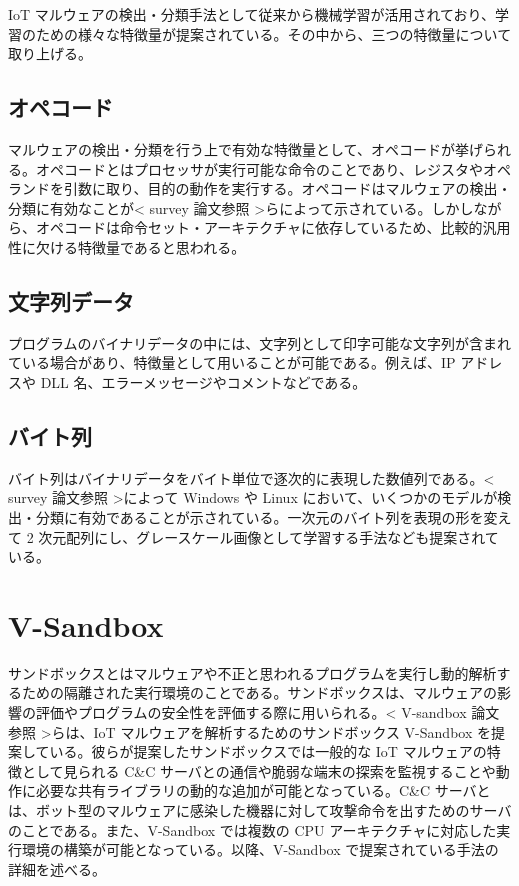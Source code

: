 \documentclass[12pt,a4paper,titlepage,report]{jsbook}
\begin{document}
IoT マルウェアの検出・分類手法として従来から機械学習が活用されており、学習のための様々な特徴量が提案されている。その中から、三つの特徴量について取り上げる。

\subsection{オペコード}
マルウェアの検出・分類を行う上で有効な特徴量として、オペコードが挙げられる。オペコードとはプロセッサが実行可能な命令のことであり、レジスタやオペランドを引数に取り、目的の動作を実行する。オペコードはマルウェアの検出・分類に有効なことが< survey 論文参照 >らによって示されている\*。しかしながら、オペコードは命令セット・アーキテクチャに依存しているため、比較的汎用性に欠ける特徴量であると思われる。

\subsection{文字列データ}
プログラムのバイナリデータの中には、文字列として印字可能な文字列が含まれている場合があり、特徴量として用いることが可能である。例えば、IP アドレスや DLL 名、エラーメッセージやコメントなどである。

\subsection{バイト列}
バイト列はバイナリデータをバイト単位で逐次的に表現した数値列である。< survey 論文参照 >によって Windows や Linux において、いくつかのモデルが検出・分類に有効であることが示されている。一次元のバイト列を表現の形を変えて 2 次元配列にし、グレースケール画像として学習する手法なども提案されている。

\section{V-Sandbox}
サンドボックスとはマルウェアや不正と思われるプログラムを実行し動的解析するための隔離された実行環境のことである。サンドボックスは、マルウェアの影響の評価やプログラムの安全性を評価する際に用いられる。< V-sandbox 論文参照 >らは、IoT マルウェアを解析するためのサンドボックス V-Sandbox を提案している。彼らが提案したサンドボックスでは一般的な IoT マルウェアの特徴として見られる C\&C サーバとの通信や脆弱な端末の探索を監視することや動作に必要な共有ライブラリの動的な追加が可能となっている。C\&C サーバとは、ボット型のマルウェアに感染した機器に対して攻撃命令を出すためのサーバのことである。また、V-Sandbox では複数の CPU アーキテクチャに対応した実行環境の構築が可能となっている。以降、V-Sandbox で提案されている手法の詳細を述べる。
\end{document}
